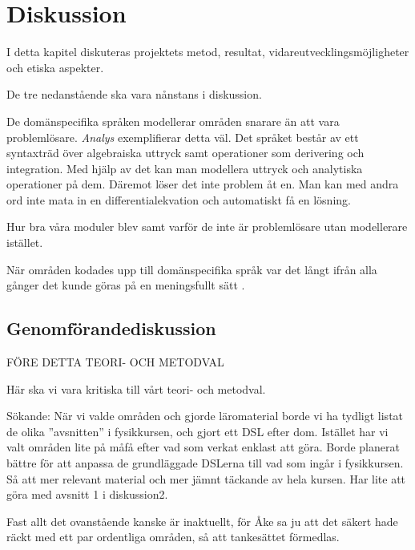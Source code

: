 
\chapter{Diskussion}

\begin{draft}

I detta kapitel diskuteras projektets metod, resultat, vidareutvecklingsmöjligheter och etiska aspekter.

\end{draft}

\begin{binge}

De tre nedanstående ska vara nånstans i diskussion.

De domänspecifika språken modellerar områden snarare än att vara problemlösare.
\textit{Analys} exemplifierar detta väl. Det språket består av ett syntaxträd
över algebraiska uttryck samt operationer som derivering och integration. Med
hjälp av det kan man modellera uttryck och analytiska operationer på dem.
Däremot löser det inte problem åt en. Man kan med andra ord inte mata in en
differentialekvation och automatiskt få en lösning.

Hur bra våra moduler blev samt varför de inte är problemlösare utan modellerare istället.

När områden kodades upp till domänspecifika språk var det långt ifrån alla gånger
det kunde göras på en meningsfullt sätt .

\section{Genomförandediskussion}

FÖRE DETTA TEORI- OCH METODVAL

Här ska vi vara kritiska till vårt teori- och metodval.

Sökande: När vi valde områden och gjorde läromaterial borde vi ha tydligt listat de olika ''avsnitten'' i fysikkursen, och gjort ett DSL efter dom. Istället har vi valt områden lite på måfå efter vad som verkat enklast att göra. Borde planerat bättre för att anpassa de grundläggade DSLerna till vad som ingår i fysikkursen. Så att mer relevant material och mer jämnt täckande av hela kursen. Har lite att göra med avsnitt 1 i diskussion2.

Fast allt det ovanstående kanske är inaktuellt, för Åke sa ju att det säkert hade räckt med ett par ordentliga områden, så att tankesättet förmedlas.


\end{binge}

